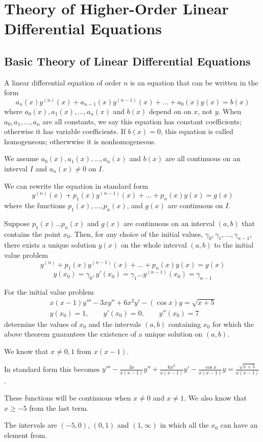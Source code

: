 \documentclass[../diffeq.tex]{subfiles}
\begin{document}
\chapter{Theory of Higher-Order Linear Differential Equations}
\section{Basic Theory of Linear Differential Equations}
A linear differential equation of order $n$ is an equation that can be written in the form 
\[ a_n(x)y^{(n)}(x)+a_{n-1}(x)y^{(n-1)}(x)+\dots + a_0(x)y(x)=b(x)\]
where $a_0(x),a_1(x),\dots,a_n(x)$ and $b(x)$ depend on on $x$, not $y$. When $a_0,a_1,\dots,a_n$ are all constants, we say this equation has constant coefficients; otherwise 
it has variable coefficients. If $b(x)=0$, this equation is called homogeneous; otherwwise it is nonhomogeneous. 

We assume $a_0(x),a_1(x),\dots,a_n(x)$ and $b(x)$ are all continuous on an interval $I$ and $a_n(x)\neq 0$ on $I$.

We can rewrite the equation in standard form 
\[ y^{(n)}(x)+p_1(x)y^{(n-1)}(x)+\dots +p_n(x)y(x)=g(x)\]
where the functions $p_1(x),\dots,p_n(x)$, and $g(x)$ are continuous on $I$.

\begin{theorem}
    Suppose $p_1(x)\dots p_n(x)$ and $g(x)$ are continuous on an interval $(a,b)$ that contains the point $x_0$. Then, for any choice of the initial values, $\gamma_0,\gamma_1,\dots,\gamma_{n-1}$, there exists a unique solution $y(x)$ on the whole interval $(a,b)$ to the initial value problem 
    \[ y^{(n)}+p_1(x)y^{(n-1)}(x)+\dots+p_n(x)y(x)=g(x) \] 
    \[ y(x_0)=\gamma_0, y'(x_0)=\gamma_1 \dots y^{(n-1)}(x_0)=\gamma_{n-1} \]
\end{theorem}

\begin{example}
    For the initial value problem 
    \begin{align*}
        x(x-1)y'''-3xy''+6x^2y'-(\cos x)y=\sqrt{x+5} \\ 
        y(x_0) = 1, \qquad y'(x_0)=0, \qquad y''(x_0)=7
    \end{align*}
    determine the values of $x_0$ and the intervals $(a,b)$ containing $x_0$ for which the above theorem guarantees the existence of a unique solution on $(a,b)$.

    We know that $x\neq 0,1$ from $x(x-1)$.

    In standard form this becomes $y'''-\frac{3x}{x(x-1)}y''+\frac{6x^2}{x(x-1)}y'-\frac{\cos x}{x(x-1)}y=\frac{\sqrt{x+5}}{x(x-1)}$.

    These functions will be continuous when $x\neq 0$ and $x\neq 1$. We also know that $x\geq -5$ from the last term.

    The intervals are $(-5,0)$, $(0,1)$ and $(1,\infty)$ in which all the $x_0$ can have an element from.
\end{example}
\end{document}
